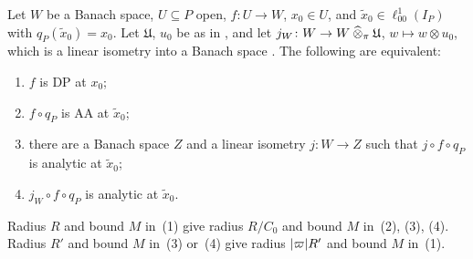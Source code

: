 \begin{theorem}\label{dp:thm:normal-form}
Let $W$ be a Banach space, $U\subseteq P$ open, $f\colon U\to W$, $x_0\in U$, and $\tilde x_0\in\ell^1_{00}(I_P)$ with $q_P(\tilde x_0)=x_0$. Let $\mathfrak U$, $u_0$ be as in \cite[(14.8)]{I}, and let $j_W\colon W\to W\mathbin{\widehat\otimes}_\pi\mathfrak U$, $w\mapsto w\otimes u_0$, which is a linear isometry into a Banach space \cite[Remark~14.41]{I}. The following are equivalent:
\begin{enumerate}
\item $f$ is DP at $x_0$;
\item $f\circ q_P$ is AA at $\tilde x_0$;
\item there are a Banach space $Z$ and a linear isometry $j\colon W\to Z$ such that $j\circ f\circ q_P$ is analytic at $\tilde x_0$;
\item $j_W\circ f\circ q_P$ is analytic at $\tilde x_0$.
\end{enumerate}
Radius $R$ and bound $M$ in~(1) give radius $R/C_0$ and bound $M$ in~(2), (3), (4). Radius $R'$ and bound $M$ in~(3) or~(4) give radius $\lvert \varpi\rvert R'$ and bound $M$ in~(1).
\end{theorem}

